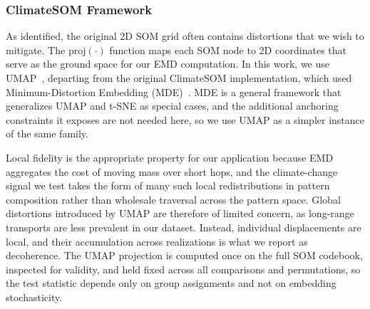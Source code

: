 \subsubsection{ClimateSOM Framework}
%
As identified, the original 2D SOM grid often contains distortions that we wish to mitigate.
%
The $\text{proj}(\cdot)$ function maps each SOM node to 2D coordinates that serve as the ground space for our EMD computation.
%
In this work, we use UMAP~\cite{mcinnes2018umap}, departing from the original ClimateSOM implementation, which used Minimum-Distortion Embedding (MDE)~\cite{agrawal2021minimum}.
%
MDE is a general framework that generalizes UMAP and t-SNE as special cases, and the additional anchoring constraints it exposes are not needed here, so we use UMAP as a simpler instance of the same family.

Local fidelity is the appropriate property for our application because EMD aggregates the cost of moving mass over short hops, and the climate-change signal we test takes the form of many such local redistributions in pattern composition rather than wholesale traversal across the pattern space.
%
Global distortions introduced by UMAP are therefore of limited concern, as long-range transports are less prevalent in our dataset. 
%
Instead, individual displacements are local, and their accumulation across realizations is what we report as decoherence.
%
The UMAP projection is computed once on the full SOM codebook, inspected for validity, and held fixed across all comparisons and permutations, so the test statistic depends only on group assignments and not on embedding stochasticity.


